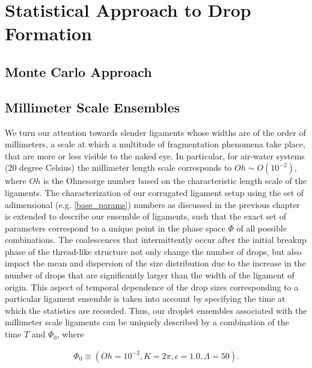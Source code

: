 \setchapterpreamble[u]{\margintoc}
\chapter{Statistical Approach to Drop Formation}


\section{Monte Carlo Approach}





\section{Millimeter Scale Ensembles}

We turn our attention towards slender ligaments whose widths are of the 
order of millimeters, a scale at which a multitude of fragmentation phenomena
take place, that are more or less visible to the naked eye.
In particular, for air-water systems (20 degree Celsius) the millimeter length 
scale corresponds to $Oh \sim O(10^{-2})$, where $Oh$ is the Ohnesorge number
based on the characteristic length scale of the ligaments. 
The characterization of our corrugated ligament setup using the set of adimensional
(e.g. \eqref{base_params}) numbers as discussed in the previous chapter is extended 
to describe our ensemble of ligaments, such that the exact set of parameters
correspond to a unique point in the phase space $\Phi$ of all possible combinations. 
The coalescences that intermittently occur after the initial breakup phase of 
the thread-like structure not only change the number of drops, but also impact the 
mean and dispersion of the size distribution due to the increase in the number of drops that 
are significantly larger than the width of the ligament of origin.   
This aspect of temporal dependence of the drop sizes corresponding to a particular ligament ensemble
is taken into account by specifying the time at which the statistics are recorded. 
Thus, our droplet ensembles associated with the millimeter scale ligaments can be uniquely described 
by a combination of the time $T$ and $\Phi_0$, where

\begin{align}
	\Phi_0 \equiv \left( Oh=10^{-2}, K=2\pi, \epsilon=1.0, \Lambda=50 \right). 
\end{align}

